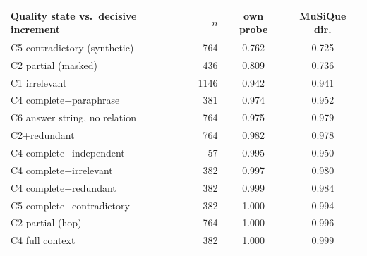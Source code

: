 \begin{tabular}{lrcc}
\toprule
Quality state vs.\ decisive increment & $n$ & own probe & MuSiQue dir. \\
\midrule
C5 contradictory (synthetic) & 764 & 0.762 & 0.725 \\
C2 partial (masked) & 436 & 0.809 & 0.736 \\
C1 irrelevant & 1146 & 0.942 & 0.941 \\
C4 complete+paraphrase & 381 & 0.974 & 0.952 \\
C6 answer string, no relation & 764 & 0.975 & 0.979 \\
C2+redundant & 764 & 0.982 & 0.978 \\
C4 complete+independent & 57 & 0.995 & 0.950 \\
C4 complete+irrelevant & 382 & 0.997 & 0.980 \\
C4 complete+redundant & 382 & 0.999 & 0.984 \\
C5 complete+contradictory & 382 & 1.000 & 0.994 \\
C2 partial (hop) & 764 & 1.000 & 0.996 \\
C4 full context & 382 & 1.000 & 0.999 \\
\bottomrule
\end{tabular}